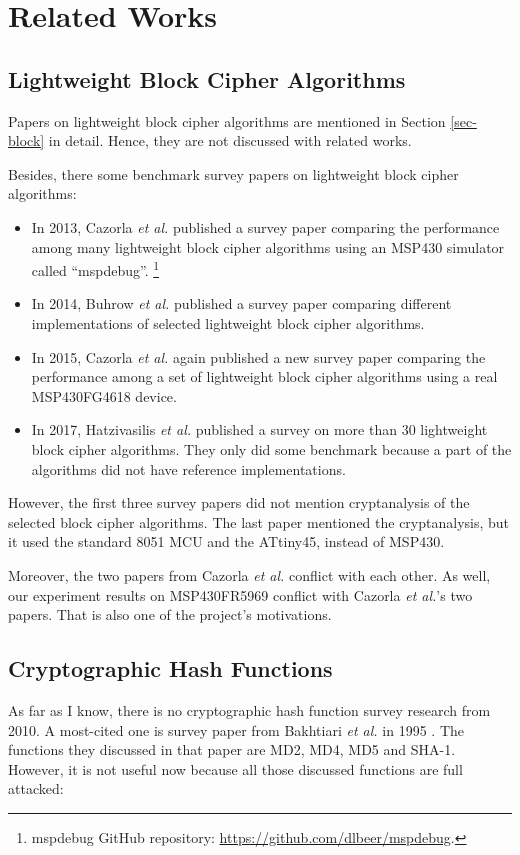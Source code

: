 \documentclass[sigconf, review=false]{acmart}
\begin{document}
\section{Related Works}
\subsection{Lightweight Block Cipher Algorithms}
Papers on lightweight block cipher algorithms are mentioned in Section \ref{sec-block} in detail.
Hence, they are not discussed with related works.

Besides, there some benchmark survey papers on lightweight block cipher algorithms:

\begin{itemize}
    \item In 2013, Cazorla \textit{et al.} published a survey paper comparing the performance among
          many lightweight block cipher algorithms using an MSP430 simulator called ``mspdebug''.
          \footnote{mspdebug GitHub repository: \url{https://github.com/dlbeer/mspdebug}.} \cite{cazorla2013survey}
    \item In 2014, Buhrow \textit{et al.} published a survey paper comparing different implementations
          of selected lightweight block cipher algorithms. \cite{buhrow2014block}
    \item In 2015, Cazorla \textit{et al.} again published a new survey paper comparing the performance among
          a set of lightweight block cipher algorithms using a real MSP430FG4618 device. \cite{cazorla2015survey}
    \item In 2017, Hatzivasilis \textit{et al.} published a survey on more than 30 lightweight block cipher algorithms.
          They only did some benchmark because a part of the algorithms did not have reference implementations. \cite{hatzivasilis2017review}
\end{itemize}

However, the first three survey papers did not mention cryptanalysis of the selected block cipher algorithms.
The last paper mentioned the cryptanalysis, but it used the standard 8051 MCU and the ATtiny45, instead of MSP430.

Moreover, the two papers from Cazorla \textit{et al.} conflict with each other.
As well, our experiment results on MSP430FR5969 conflict with Cazorla \textit{et al.}'s two papers.
That is also one of the project's motivations.

\subsection{Cryptographic Hash Functions}
As far as I know, there is no cryptographic hash function survey research from 2010.
A most-cited one is survey paper from Bakhtiari \textit{et al.} in 1995 \cite{bakhtiari1995cryptographic}.
The functions they discussed in that paper are MD2, MD4, MD5 and SHA-1.
However, it is not useful now because all those discussed functions are full attacked:
\end{document}
